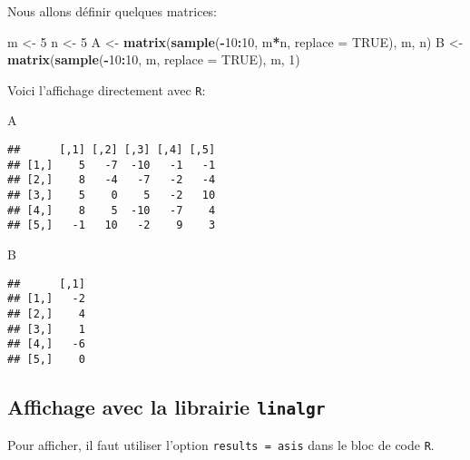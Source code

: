 \documentclass[]{article}
\newenvironment{Shaded}{\begin{snugshade}}{\end{snugshade}}
\newcommand{\DataTypeTok}[1]{\textcolor[rgb]{0.13,0.29,0.53}{#1}}
\newcommand{\DecValTok}[1]{\textcolor[rgb]{0.00,0.00,0.81}{#1}}
\newcommand{\KeywordTok}[1]{\textcolor[rgb]{0.13,0.29,0.53}{\textbf{#1}}}
\newcommand{\NormalTok}[1]{#1}
\newcommand{\OperatorTok}[1]{\textcolor[rgb]{0.81,0.36,0.00}{\textbf{#1}}}
\newcommand{\OtherTok}[1]{\textcolor[rgb]{0.56,0.35,0.01}{#1}}
\newcommand{\StringTok}[1]{\textcolor[rgb]{0.31,0.60,0.02}{#1}}
\begin{document}
Nous allons définir quelques matrices:

\begin{Shaded}
\begin{Highlighting}[]
\NormalTok{m <-}\StringTok{ }\DecValTok{5}
\NormalTok{n <-}\StringTok{ }\DecValTok{5}
\NormalTok{A <-}\StringTok{ }\KeywordTok{matrix}\NormalTok{(}\KeywordTok{sample}\NormalTok{(}\OperatorTok{-}\DecValTok{10}\OperatorTok{:}\DecValTok{10}\NormalTok{, m}\OperatorTok{*}\NormalTok{n, }\DataTypeTok{replace =} \OtherTok{TRUE}\NormalTok{), m, n)}
\NormalTok{B <-}\StringTok{ }\KeywordTok{matrix}\NormalTok{(}\KeywordTok{sample}\NormalTok{(}\OperatorTok{-}\DecValTok{10}\OperatorTok{:}\DecValTok{10}\NormalTok{, m, }\DataTypeTok{replace =} \OtherTok{TRUE}\NormalTok{), m, }\DecValTok{1}\NormalTok{)}
\end{Highlighting}
\end{Shaded}

Voici l'affichage directement avec \texttt{R}:

\begin{Shaded}
\begin{Highlighting}[]
\NormalTok{A}
\end{Highlighting}
\end{Shaded}

\begin{verbatim}
##      [,1] [,2] [,3] [,4] [,5]
## [1,]    5   -7  -10   -1   -1
## [2,]    8   -4   -7   -2   -4
## [3,]    5    0    5   -2   10
## [4,]    8    5  -10   -7    4
## [5,]   -1   10   -2    9    3
\end{verbatim}

\begin{Shaded}
\begin{Highlighting}[]
\NormalTok{B}
\end{Highlighting}
\end{Shaded}

\begin{verbatim}
##      [,1]
## [1,]   -2
## [2,]    4
## [3,]    1
## [4,]   -6
## [5,]    0
\end{verbatim}

\hypertarget{affichage-avec-la-librairie-linalgr}{%
\subsection{\texorpdfstring{Affichage avec la librairie
\texttt{linalgr}}{Affichage avec la librairie linalgr}}\label{affichage-avec-la-librairie-linalgr}}

Pour afficher, il faut utiliser l'option
\texttt{results\ =\ \textquotesingle{}asis\textquotesingle{}} dans le
bloc de code \texttt{R}.
\end{document}
